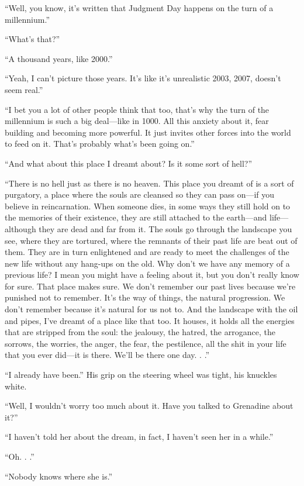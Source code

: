 ``Well, you know, it's written that Judgment Day happens on the turn of
a millennium.''

``What's that?''

``A thousand years, like 2000.''

``Yeah, I can't picture those years. It's like it's unrealistic 2003,
2007, doesn't seem real.''

``I bet you a lot of other people think that too, that's why the turn of
the millennium is such a big deal---like in 1000. All this anxiety about
it, fear building and becoming more powerful. It just invites other
forces into the world to feed on it. That's probably what's been going
on.''

``And what about this place I dreamt about? Is it some sort of hell?''

``There is no hell just as there is no heaven. This place you dreamt of
is a sort of purgatory, a place where the souls are cleansed so they can
pass on---if you believe in reincarnation. When someone dies, in some
ways they still hold on to the memories of their existence, they are
still attached to the earth---and life---although they are dead and far
from it. The souls go through the landscape you see, where they are
tortured, where the remnants of their past life are beat out of them.
They are in turn enlightened and are ready to meet the challenges of the
new life without any hang-ups on the old. Why don't we have any memory
of a previous life? I mean you might have a feeling about it, but you
don't really know for sure. That place makes sure. We don't remember our
past lives because we're punished not to remember. It's the way of
things, the natural progression. We don't remember because it's natural
for us not to. And the landscape with the oil and pipes, I've dreamt of
a place like that too. It houses, it holds all the energies that are
stripped from the soul: the jealousy, the hatred, the arrogance, the
sorrows, the worries, the anger, the fear, the pestilence, all the shit
in your life that you ever did---it is there. We'll be there one day. .
.''

``I already have been.'' His grip on the steering wheel was tight, his
knuckles white.

``Well, I wouldn't worry too much about it. Have you talked to Grenadine
about it?''

``I haven't told her about the dream, in fact, I haven't seen her in a
while.''

``Oh. . .''

``Nobody knows where she is.''

